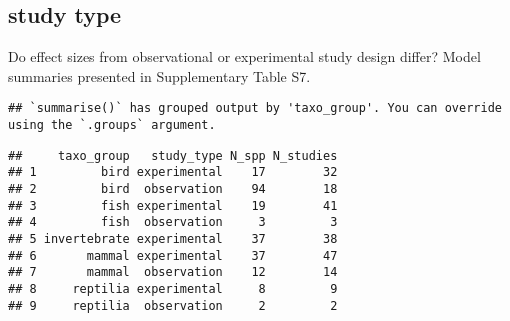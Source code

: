 \documentclass[]{article}
\newenvironment{Shaded}{\begin{snugshade}}{\end{snugshade}}
\newcommand{\KeywordTok}[1]{\textcolor[rgb]{0.13,0.29,0.53}{\textbf{#1}}}
\newcommand{\DataTypeTok}[1]{\textcolor[rgb]{0.13,0.29,0.53}{#1}}
\newcommand{\StringTok}[1]{\textcolor[rgb]{0.31,0.60,0.02}{#1}}
\newcommand{\CommentTok}[1]{\textcolor[rgb]{0.56,0.35,0.01}{\textit{#1}}}
\newcommand{\OperatorTok}[1]{\textcolor[rgb]{0.81,0.36,0.00}{\textbf{#1}}}
\newcommand{\NormalTok}[1]{#1}
\begin{document}
\subsection{study type}\label{study-type}

Do effect sizes from observational or experimental study design differ?
Model summaries presented in Supplementary Table S7.

\begin{Shaded}
\end{Shaded}

\begin{verbatim}
## `summarise()` has grouped output by 'taxo_group'. You can override using the `.groups` argument.
\end{verbatim}

\begin{verbatim}
##     taxo_group   study_type N_spp N_studies
## 1         bird experimental    17        32
## 2         bird  observation    94        18
## 3         fish experimental    19        41
## 4         fish  observation     3         3
## 5 invertebrate experimental    37        38
## 6       mammal experimental    37        47
## 7       mammal  observation    12        14
## 8     reptilia experimental     8         9
## 9     reptilia  observation     2         2
\end{verbatim}
\end{document}
